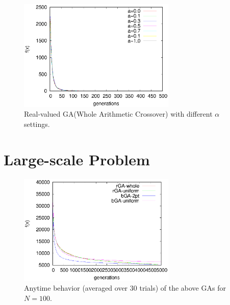﻿\documentclass[conference]{IEEEtran}
\begin{document}
\begin{CJK}{UTF8}{bsmi}
\begin{figure}[htbp]
\centerline{\includegraphics[width=7.5cm]{fig/rGA/change_a_whole.eps}}
\caption{Real-valued GA(Whole Arithmetic Crossover) with different $\alpha$ settings.}
\label{fig}
\end{figure}


\section{Large-scale Problem}
\begin{figure}[htbp]
\centerline{\includegraphics[width=7.5cm]{fig/cmp4GA/4GAs-N100.eps}}
\caption{Anytime behavior (averaged over 30 trials) of the above GAs for $N=100$.}
\label{fig}
\end{figure}


\vspace{12pt}
\end{CJK}
\end{document}
